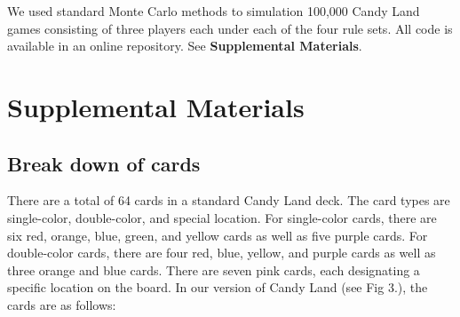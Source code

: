 \documentclass[letterpaper,9pt,twocolumn,twoside,]{pinp}
\begin{document}
We used standard Monte Carlo methods to simulation 100,000 Candy Land
games consisting of three players each under each of the four rule sets.
All code is available in an online repository. See \textbf{Supplemental
Materials}.

\newpage

\hypertarget{supplemental-materials}{%
\section{Supplemental Materials}\label{supplemental-materials}}

\hypertarget{break-down-of-cards}{%
\subsection{Break down of cards}\label{break-down-of-cards}}

There are a total of 64 cards in a standard Candy Land deck. The card
types are single-color, double-color, and special location. For
single-color cards, there are six red, orange, blue, green, and yellow
cards as well as five purple cards. For double-color cards, there are
four red, blue, yellow, and purple cards as well as three orange and
blue cards. There are seven pink cards, each designating a specific
location on the board. In our version of Candy Land (see Fig 3.), the
cards are as follows:

\begin{Shaded}
\begin{Highlighting}[]
\NormalTok{(} \NormalTok{, } \NormalTok{)}
\end{Highlighting}
\end{Shaded}
\end{document}

